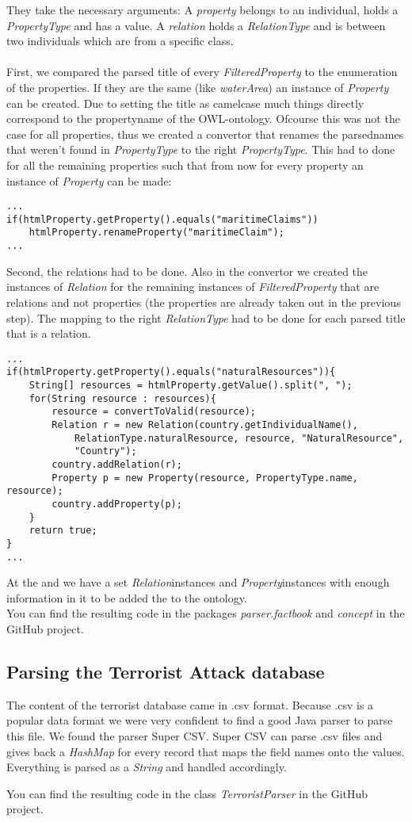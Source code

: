 \documentclass{article}
\begin{document}
They take the necessary arguments: A \textit{property} belongs to an individual, holds a \textit{PropertyType} and has a value.
A \textit{relation} holds a \textit{RelationType} and is between two individuals which are from a specific class.
\\
\\First, we compared the parsed title of every \textit{FilteredProperty} to the enumeration of the properties. If they are the same (like \textit{waterArea}) an instance of \textit{Property} can be created.
Due to setting the title as camelcase much things directly correspond to the propertyname of the OWL-ontology.
Ofcourse this was not the case for all properties, thus we created a convertor that renames the parsednames that weren't found in \textit{PropertyType} to the right \textit{PropertyType}. This had to done for all the remaining properties such that from now for every property an instance of \textit{Property} can be made:
\begin{lstlisting}
...
if(htmlProperty.getProperty().equals("maritimeClaims"))
	htmlProperty.renameProperty("maritimeClaim");
...
\end{lstlisting}
Second, the relations had to be done. Also in the convertor we created the instances of \textit{Relation} for the remaining instances of \textit{FilteredProperty} that are relations and not properties (the properties are already taken out in the previous step).
The mapping to the right \textit{RelationType} had to be done for each parsed title that is a relation.
\begin{lstlisting}
...
if(htmlProperty.getProperty().equals("naturalResources")){
	String[] resources = htmlProperty.getValue().split(", ");
	for(String resource : resources){
		resource = convertToValid(resource);
		Relation r = new Relation(country.getIndividualName(), 
			RelationType.naturalResource, resource, "NaturalResource", 
			"Country");
		country.addRelation(r);
		Property p = new Property(resource, PropertyType.name, resource);
		country.addProperty(p);
	}
	return true;
}
...
\end{lstlisting}
At the and we have a set \textit{Relation}instances and \textit{Property}instances with enough information in it to be added the to the ontology.
\\You can find the resulting code in the packages \textit{parser.factbook} and \textit{concept} in the GitHub project\cite{githubproject}.

\subsection{Parsing the Terrorist Attack database}
\label{sec:terrorist_db}
The content of the terrorist database came in .csv format. Because .csv is a popular data format we were very confident to find a good Java parser to parse this file. We found the parser Super CSV\cite{supercsv}. Super CSV can parse .csv files and gives back a \textit{HashMap} for every record that maps the field names onto the values. Everything is parsed as a \textit{String} and handled accordingly.\par
You can find the resulting code in the class \textit{TerroristParser} in the GitHub project\cite{githubproject}.
\end{document}
